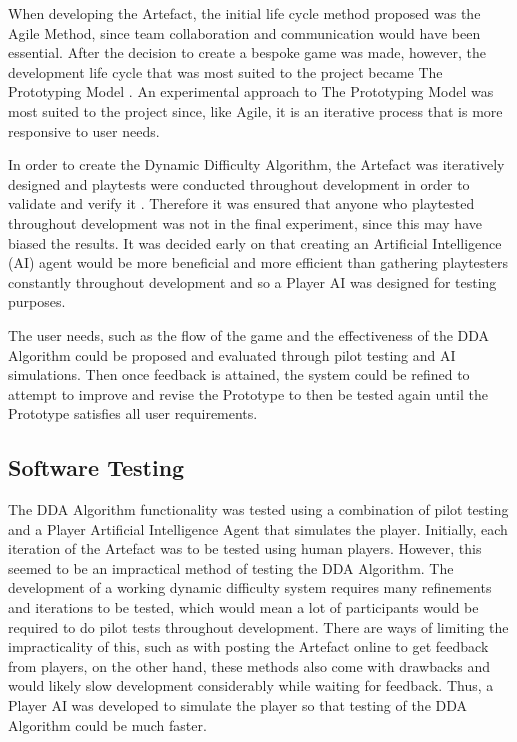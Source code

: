 \documentclass[journal]{IEEEtran}
\begin{document}
When developing the Artefact, the initial life cycle method proposed was the Agile Method, since team collaboration and communication would have been essential. After the decision to create a bespoke game was made, however, the development life cycle that was most suited to the project became The Prototyping Model \cite{isaias2015information}. An experimental approach to The Prototyping Model was most suited to the project since, like Agile, it is an iterative process that is more responsive to user needs. 

In order to create the Dynamic Difficulty Algorithm, the Artefact was iteratively designed and playtests were conducted throughout development in order to validate and verify it \cite{fullerton2004game}. Therefore it was ensured that anyone who playtested throughout development was not in the final experiment, since this may have biased the results. It was decided early on that creating an Artificial Intelligence (AI) agent would be more beneficial and more efficient than gathering playtesters constantly throughout development and so a Player AI was designed for testing purposes.

The user needs, such as the flow of the game and the effectiveness of the DDA Algorithm could be proposed and evaluated through pilot testing and AI simulations. Then once feedback is attained, the system could be refined to attempt to improve and revise the Prototype to then be tested again until the Prototype satisfies all user requirements.

\subsection{Software Testing}

The DDA Algorithm functionality was tested using a combination of pilot testing and a Player Artificial Intelligence Agent that simulates the player. Initially, each iteration of the Artefact was to be tested using human players. However, this seemed to be an impractical method of testing the DDA Algorithm. The development of a working dynamic difficulty system requires many refinements and iterations to be tested, which would mean a lot of participants would be required to do pilot tests throughout development. There are ways of limiting the impracticality of this, such as with posting the Artefact online to get feedback from players, on the other hand, these methods also come with drawbacks and would likely slow development considerably while waiting for feedback. Thus, a Player AI was developed to simulate the player so that testing of the DDA Algorithm could be much faster. 
\end{document}
